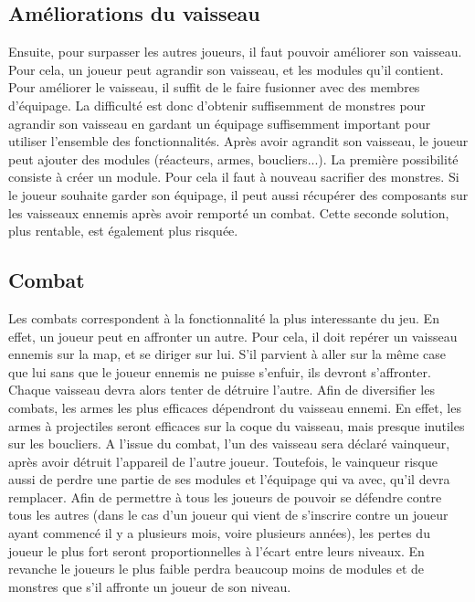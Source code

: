 \documentclass[a4paper,11pt]{report}
\begin{document}
    \subsection{Améliorations du vaisseau}
      Ensuite, pour surpasser les autres joueurs, il faut pouvoir améliorer son vaisseau. Pour cela, un joueur peut agrandir son vaisseau, et les modules qu'il contient.
      \newline
      Pour améliorer le vaisseau, il suffit de le faire fusionner avec des membres d'équipage. La difficulté est donc d'obtenir suffisemment de monstres pour agrandir son vaisseau en gardant un équipage suffisemment important pour utiliser l'ensemble des fonctionnalités.
      \newline
      Après avoir agrandit son vaisseau, le joueur peut ajouter des modules (réacteurs, armes, boucliers...).
      La première possibilité consiste à créer un module. Pour cela il faut à nouveau sacrifier des monstres. 
      Si le joueur souhaite garder son équipage, il peut aussi récupérer des composants sur les vaisseaux ennemis après avoir remporté un combat.
      Cette seconde solution, plus rentable, est également plus risquée.
      
    \subsection{Combat}
      Les combats correspondent à la fonctionnalité la plus interessante du jeu. En effet, un joueur peut en affronter un autre.
      Pour cela, il doit repérer un vaisseau ennemis sur la map, et se diriger sur lui. 
      S'il parvient à aller sur la même case que lui sans que le joueur ennemis ne puisse s'enfuir, ils devront s'affronter.
      Chaque vaisseau devra alors tenter de détruire l'autre. Afin de diversifier les combats, les armes les plus efficaces dépendront du vaisseau ennemi.
      En effet, les armes à projectiles seront efficaces sur la coque du vaisseau, mais presque inutiles sur les boucliers.
      A l'issue du combat, l'un des vaisseau sera déclaré vainqueur, après avoir détruit l'appareil de l'autre joueur. 
      Toutefois, le vainqueur risque aussi de perdre une partie de ses modules et l'équipage qui va avec, qu'il devra remplacer.
      Afin de permettre à tous les joueurs de pouvoir se défendre contre tous les autres (dans le cas d'un joueur qui vient de s'inscrire contre un joueur ayant commencé il y a plusieurs mois, voire plusieurs années), les pertes du joueur le plus fort seront proportionnelles à l'écart entre leurs niveaux.
      En revanche le joueurs le plus faible perdra beaucoup moins de modules et de monstres que s'il affronte un joueur de son niveau.
      
\end{document}
